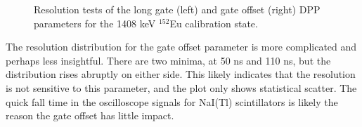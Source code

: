 \begin{figure}[t]
\centering
{}
\caption{\label{fig:resolution_plots}Resolution tests of the long gate (left) and gate offset (right) DPP parameters for the 1408 keV $^{152}$Eu calibration state.}
\end{figure}

The resolution distribution for the gate offset parameter is more complicated and perhaps less insightful. There are two minima, at 50 ns and 110 ns, but the distribution rises abruptly on either side. This likely indicates that the resolution is not sensitive to this parameter, and the plot only shows statistical scatter. The quick fall time in the oscilloscope signals for NaI(Tl) scintillators is likely the reason the gate offset has little impact.

